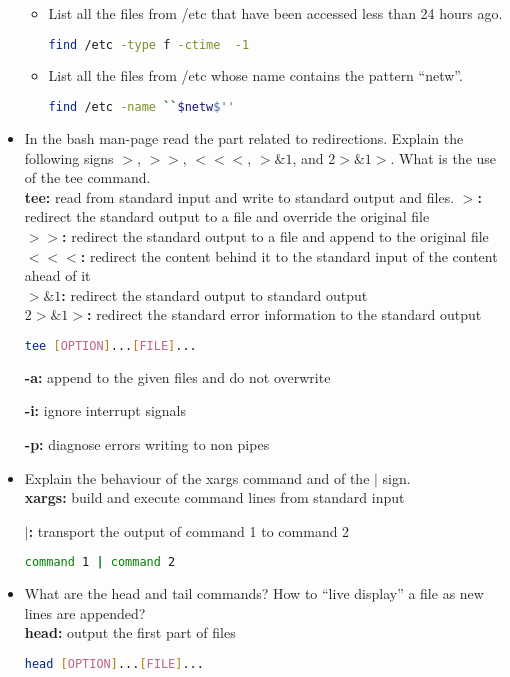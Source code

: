 \documentclass{article}
\begin{document}
\begin{itemize}
\begin{itemize}
\item List all the files from /etc that have been accessed less than 24 hours ago.\\
\begin{lstlisting}[language=bash]
find /etc -type f -ctime  -1
\end{lstlisting}
\item List all the files from /etc whose name contains the pattern “netw”.\\
\begin{lstlisting}[language=bash]
find /etc -name ``$netw$''
\end{lstlisting}
\end{itemize}
\item In the bash man-page read the part related to redirections. Explain the following signs $>$, $>>$, $<<<$, $>\&1$, and $2>\&1 >$. What is the use of the tee command.\\
\textbf{tee:} read from standard input and write to standard output and files.
\textbf{$>$:} redirect the standard output to a file and override the original file\\
\textbf{$>>$:} redirect the standard output to a file and append to the original file\\
\textbf{$<<<$:} redirect the content behind it to the standard input of the content ahead of it\\
\textbf{$>\&1$:} redirect the standard output to standard output\\
\textbf{$2>\&1>$:} redirect the standard error information to the standard output
\begin{lstlisting}[language=bash]
tee [OPTION]...[FILE]...
\end{lstlisting}
\textbf{-a:} append to the given files and do not overwrite

\textbf{-i:} ignore interrupt signals

\textbf{-p:} diagnose errors writing to non pipes

\item Explain the behaviour of the xargs command and of the $|$ sign.\\
\textbf{xargs:} build and execute command lines from standard input

\textbf{$|$:} transport the output of command 1 to command 2
\begin{lstlisting}[language=bash]
command 1 | command 2
\end{lstlisting}
\item What are the head and tail commands? How to “live display” a file as new lines are appended?\\
\textbf{head:} output the first part of files
\begin{lstlisting}[language=bash]
head [OPTION]...[FILE]...
\end{lstlisting}


\end{itemize}
\end{document}
